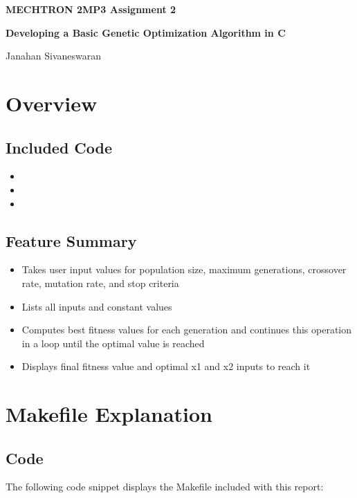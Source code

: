 \documentclass[12pt]{article}
\begin{document}
	
	\justifying
	
	\begin{center}
		\textbf{{\large MECHTRON 2MP3 Assignment 2}}
		
		\textbf{Developing a Basic Genetic Optimization Algorithm in C} 
		
		Janahan Sivaneswaran
	\end{center}
	

	
	
	
	\section{Overview}

        \subsection{Included Code}
        \begin{itemize}
		\item {}
		\item {}
		\item {}
	\end{itemize}

        \subsection{Feature Summary}
        \begin{itemize}
		\item Takes user input values for population size, maximum generations, crossover rate, mutation rate, and stop criteria
		\item Lists all inputs and constant values
		\item Computes best fitness values for each generation and continues this operation in a loop until the optimal value is reached
            \item Displays final fitness value and optimal x1 and x2 inputs to reach it
	\end{itemize}
        
	
	
	\section{Makefile Explanation}

	\subsection {Code}
            The following code snippet displays the Makefile included with this report:
		
\end{document}
